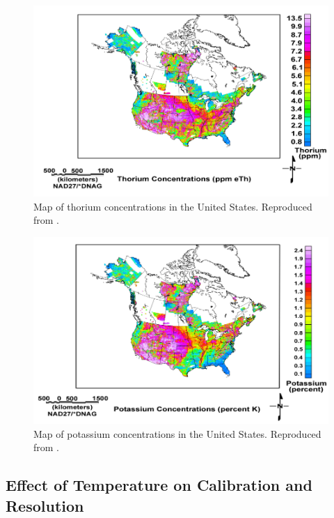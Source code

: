 \begin{figure}[H]
\centering
\includegraphics[trim=10 0 5 0, clip, width=1.0\linewidth]{images/USGS_th_conc}
\caption{Map of thorium concentrations in the United States. Reproduced from \cite{USGS}.}
\label{fig:USGS_th_conc}
\end{figure}

\begin{figure}[H]
\centering
\includegraphics[trim=10 0 5 0, clip, width=1.0\linewidth]{images/USGS_k_conc}
\caption{Map of potassium concentrations in the United States. Reproduced from \cite{USGS}.}
\label{fig:USGS_k_conc}
\end{figure}


\subsection{Effect of Temperature on Calibration and Resolution}


